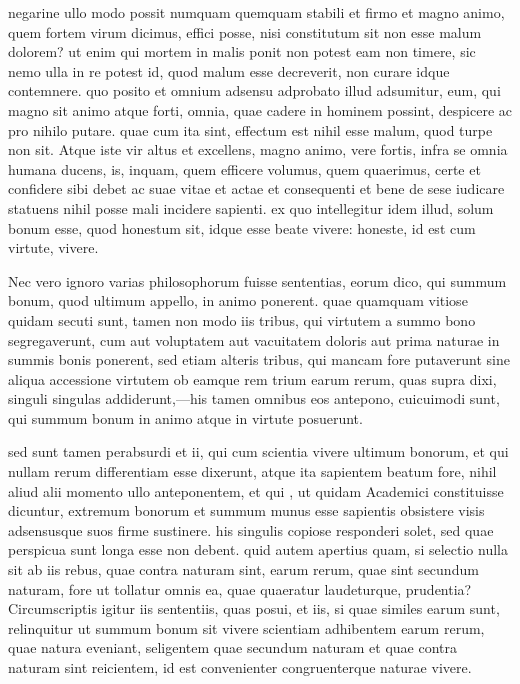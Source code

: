  negarine ullo modo possit numquam quemquam stabili et firmo et magno animo, quem fortem virum dicimus, effici posse, nisi constitutum sit non esse malum dolorem? ut enim qui mortem in malis ponit non potest eam non timere, sic nemo ulla in re potest id, quod malum esse decreverit, non curare idque contemnere. quo posito et omnium adsensu adprobato illud adsumitur, eum, qui magno sit animo atque forti, omnia, quae cadere in hominem possint, despicere ac pro nihilo putare. quae cum ita sint, effectum est nihil esse malum, quod turpe non sit. Atque iste vir altus et excellens, magno animo, vere fortis, infra se omnia humana ducens, is, inquam, quem efficere volumus, quem quaerimus, certe et confidere sibi debet ac suae vitae et actae et consequenti et bene de sese iudicare statuens nihil posse mali incidere sapienti. ex quo intellegitur idem illud, solum bonum esse, quod honestum sit, idque esse beate vivere: honeste, id est cum virtute, vivere.

 Nec vero ignoro varias philosophorum fuisse sententias, eorum dico, qui summum bonum, quod ultimum appello, in animo ponerent. quae quamquam vitiose quidam secuti sunt, tamen non modo iis tribus, qui virtutem a summo bono segregaverunt, cum aut voluptatem aut vacuitatem doloris aut prima naturae in summis bonis ponerent, sed etiam alteris tribus, qui mancam fore putaverunt sine aliqua accessione virtutem ob eamque rem trium earum rerum, quas supra dixi, singuli singulas addiderunt,—his tamen omnibus eos antepono, cuicuimodi sunt, qui summum bonum in animo atque in virtute posuerunt.

 sed sunt tamen perabsurdi et ii, qui cum scientia vivere ultimum bonorum, et qui nullam rerum differentiam esse dixerunt, atque ita sapientem beatum fore, nihil aliud alii momento ullo anteponentem, et qui , ut quidam Academici constituisse dicuntur, extremum bonorum et summum munus esse sapientis obsistere visis adsensusque suos firme sustinere. his singulis copiose responderi solet, sed quae perspicua sunt longa esse non debent. quid autem apertius quam, si selectio nulla sit ab iis rebus, quae contra naturam sint, earum rerum, quae sint secundum naturam, fore ut tollatur omnis ea, quae quaeratur laudeturque, prudentia? Circumscriptis igitur iis sententiis, quas posui, et iis, si quae similes earum sunt, relinquitur ut summum bonum sit vivere scientiam adhibentem earum rerum, quae natura eveniant, seligentem quae secundum naturam et quae contra naturam sint reicientem, id est convenienter congruenterque naturae vivere.

